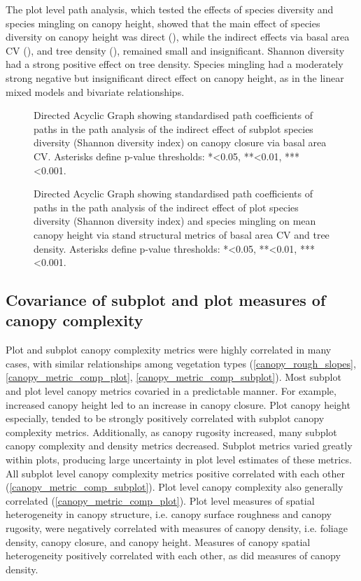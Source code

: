 \documentclass[11pt,a4paper]{article}
\begin{document}
The plot level path analysis, which tested the effects of species diversity and species mingling on canopy height, showed that the main effect of species diversity on canopy height was direct (\treeShannonHeightPath{}), while the indirect effects via basal area CV (\treeShannonBaHeightPath{}), and tree density (\treeShannonDensHeightPath{}), remained small and insignificant. Shannon diversity had a strong positive effect on tree density. Species mingling had a moderately strong negative but insignificant direct effect on canopy height, as in the linear mixed models and bivariate relationships.

\begin{figure}
	
	\caption{Directed Acyclic Graph showing standardised path coefficients of paths in the path analysis of the indirect effect of subplot species diversity (Shannon diversity index) on canopy closure via basal area CV. Asterisks define p-value thresholds: *<0.05, **<0.01, ***<0.001.}
	\label{path_diag_cover}
\end{figure}

\begin{figure}
	
	\caption{Directed Acyclic Graph showing standardised path coefficients of paths in the path analysis of the indirect effect of plot species diversity (Shannon diversity index) and species mingling on mean canopy height via stand structural metrics of basal area CV and tree density. Asterisks define p-value thresholds: *<0.05, **<0.01, ***<0.001.}
	\label{path_diag_height}
\end{figure}

\subsection{Covariance of subplot and plot measures of canopy complexity}

Plot and subplot canopy complexity metrics were highly correlated in many cases, with similar relationships among vegetation types (\autoref{canopy_rough_slopes}, \autoref{canopy_metric_comp_plot}, \autoref{canopy_metric_comp_subplot}). Most subplot and plot level canopy metrics covaried in a predictable manner. For example, increased canopy height led to an increase in canopy closure. Plot canopy height especially, tended to be strongly positively correlated with subplot canopy complexity metrics. Additionally, as canopy rugosity increased, many subplot canopy complexity and density metrics decreased. Subplot metrics varied greatly within plots, producing large uncertainty in plot level estimates of these metrics. All subplot level canopy complexity metrics positive correlated with each other (\autoref{canopy_metric_comp_subplot}). Plot level canopy complexity also generally correlated (\autoref{canopy_metric_comp_plot}). Plot level measures of spatial heterogeneity in canopy structure, i.e. canopy surface roughness and canopy rugosity, were negatively correlated with measures of canopy density, i.e. foliage density, canopy closure, and canopy height. Measures of canopy spatial heterogeneity positively correlated with each other, as did measures of canopy density.
\end{document}
